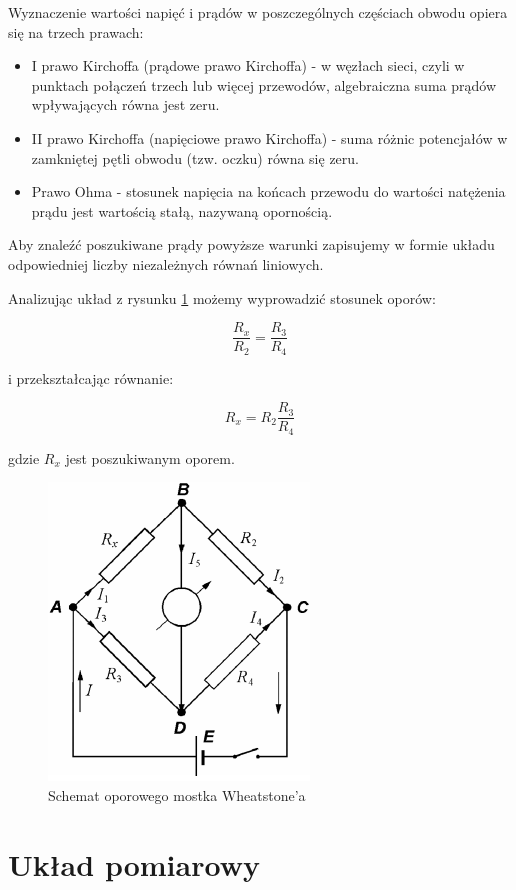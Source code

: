 \documentclass[a4paper,10pt,twoside]{article}
\begin{document}
Wyznaczenie wartości napięć i prądów w poszczególnych częściach obwodu opiera się na trzech prawach:

\begin{itemize}
  \item I prawo Kirchoffa (prądowe prawo Kirchoffa) - w węzłach sieci, czyli w punktach połączeń trzech lub więcej przewodów, algebraiczna suma prądów wpływających równa jest zeru. 
  \item II prawo Kirchoffa (napięciowe prawo Kirchoffa) - suma różnic potencjałów w zamkniętej pętli obwodu (tzw. oczku) równa się zeru.
  \item Prawo Ohma - stosunek napięcia na końcach przewodu do wartości natężenia prądu jest wartością stałą, nazywaną opornością.
\end{itemize}

Aby znaleźć poszukiwane prądy powyższe warunki zapisujemy w formie układu odpowiedniej liczby niezależnych równań liniowych.

Analizując układ z rysunku \ref{fig:mostek} możemy wyprowadzić stosunek oporów:

$$ \frac{R_x}{R_2}=\frac{R_3}{R_4} $$

i przekształcając równanie:

$$ R_x = R_2\frac{R_3}{R_4} $$

gdzie $R_x$ jest poszukiwanym oporem.

\begin{figure}[!htp]
\centerline{\includegraphics[scale=0.5]{mostek.png}}
\caption{Schemat oporowego mostka Wheatstone'a}
\label{fig:mostek}
\end{figure}

\section{Układ pomiarowy}
\end{document}
